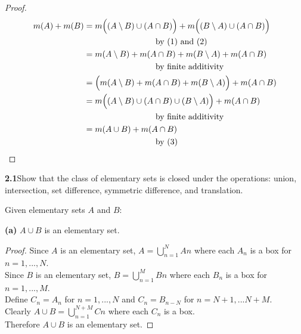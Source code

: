 \documentclass[12pt]{article}
\begin{document}
	\begin{proof}
		\begin{align*}
		m(A) + m(B) & = m\Big((A \setminus B) \cup (A \cap B)\Big) + m\Big((B \setminus A) \cup (A \cap B)\Big) \\
		& \hspace{20 ex} \text{by (1) and (2)} \\
		& = m(A \setminus B) + m(A \cap B) + m(B \setminus A) + m(A \cap B) \\
		& \hspace{20 ex} \text{by finite additivity} \\
		& = \Big( m(A \setminus B) + m(A \cap B) + m(B \setminus A) \Big) +  m(A \cap B) \\
		& = m\Big( (A \setminus B) \cup (A \cap B) \cup (B \setminus A) \Big) +  m(A \cap B)\\
		& \hspace{20 ex}  \text{by finite additivity} \\
		& = m(A \cup B) + m(A \cap B) \\
		& \hspace{20 ex} \text{by (3)}
		\end{align*}
	\end{proof}

\bigbreak
\bigbreak

	\hspace{-4 ex}\textbf{2.1}Show that the class of elementary sets is closed under the operations: union, intersection, set difference, symmetric difference, and translation. \bigbreak
	
	Given elementary sets $A$ and $B$: \bigbreak
	
	\hspace{-4 ex}\textbf{(a)} $A \cup B$ is an elementary set.
	
	
	\begin{proof}
		Since $A$ is an elementary set, $A = \bigcup_{n=1}^{N} A{n}$ where each $A_{n}$ is a box for $n=1,...,N$. \\
		Since $B$ is an elementary set, $B = \bigcup_{n=1}^{M} B{n}$ where each $B_{n}$ is a box for $n=1,...,M$. \\
		Define $C_{n} = A_{n}$ for $n=1,...,N$ and $C_{n} = B_{n-N}$ for $n=N+1,...N+M$. \\
		Clearly $A \cup B = \bigcup_{n=1}^{N+M} C{n}$ where each $C_{n}$ is a box. \\
		Therefore $A \cup B$ is an elementary set.
	\end{proof}
\end{document}
